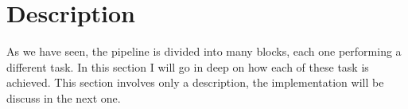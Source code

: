 
	
	\section{Description}
	
	As we have seen, the pipeline is divided into many blocks, each one performing a different task. In this section I will go in deep on how each of these task is achieved. This section involves only a description, the implementation will be discuss in the next one.
	
	
	

